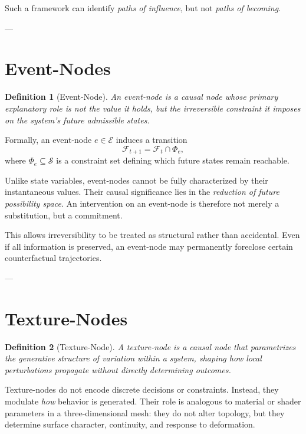 \documentclass[11pt]{article}
\newtheorem{definition}{Definition}
\newcommand{\State}{\mathcal{S}}
\newcommand{\Event}{\mathcal{E}}
\newcommand{\Future}{\mathcal{F}}
\begin{document}
Such a framework can identify \emph{paths of influence}, but not \emph{paths of becoming}.

---

\section{Event-Nodes}

\begin{definition}[Event-Node]
An \emph{event-node} is a causal node whose primary explanatory role is not the value it holds, but the irreversible constraint it imposes on the system's future admissible states.
\end{definition}

Formally, an event-node $e \in \Event$ induces a transition
\[
\Future_{t+1} = \Future_t \cap \Phi_e,
\]
where $\Phi_e \subseteq \State$ is a constraint set defining which future states remain reachable.

Unlike state variables, event-nodes cannot be fully characterized by their instantaneous values. Their causal significance lies in the \emph{reduction of future possibility space}. An intervention on an event-node is therefore not merely a substitution, but a commitment.

This allows irreversibility to be treated as structural rather than accidental. Even if all information is preserved, an event-node may permanently foreclose certain counterfactual trajectories.

---

\section{Texture-Nodes}

\begin{definition}[Texture-Node]
A \emph{texture-node} is a causal node that parametrizes the generative structure of variation within a system, shaping how local perturbations propagate without directly determining outcomes.
\end{definition}

Texture-nodes do not encode discrete decisions or constraints. Instead, they modulate \emph{how} behavior is generated. Their role is analogous to material or shader parameters in a three-dimensional mesh: they do not alter topology, but they determine surface character, continuity, and response to deformation.
\end{document}
